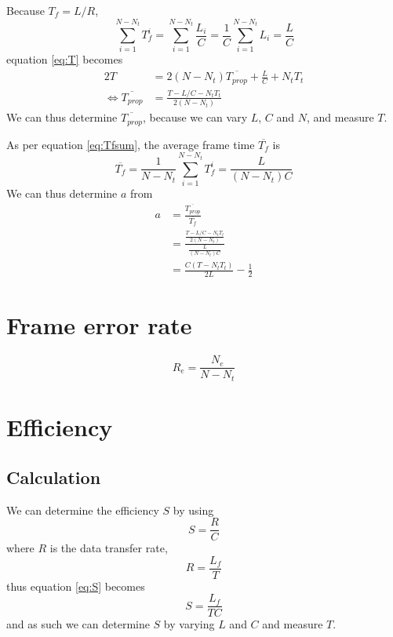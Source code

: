 \documentclass[a4paper, 11pt]{report}
\begin{document}
Because $T_f = L/R$,
\begin{equation} \label{eq:Tfsum}
	\sum_{i=1}^{N-N_t}{T_f^i} = \sum_{i=1}^{N-N_t}{\frac{L_i}{C}} = \frac{1}{C} \sum_{i=1}^{N-N_t}{L_i} = \frac{L}{C}
\end{equation}
equation \ref{eq:T} becomes
\begin{alignat}{2} \label{eq:T2}
	T & = 2 (N-N_t) \overline{T_{prop}} + \frac{L}{C} + N_t T_t \\
	\iff \overline{T_{prop}} & = \frac{T - L/C - N_t T_t}{2 (N-N_t)}
\end{alignat}
We can thus determine $\overline{T_{prop}}$, because we can vary $L$, $C$ and $N$, and measure $T$.

As per equation \ref{eq:Tfsum}, the average frame time $\overline{T_f}$ is 
\begin{equation} \label{eq:Tfmean}
	\overline{T_f} = \frac{1}{N-N_t}\sum_{i=1}^{N-N_t}{T_f^i} = \frac{L}{(N-N_t) C}
\end{equation}
We can thus determine $a$ from
\begin{equation}
\begin{alignedat}{2}
	a
	& = \frac{\overline{T_{prop}}}{\overline{T_f}} \\
	& = \frac{\frac{T - L/C - N_t T_t}{2 (N-N_t)}}{\frac{L}{(N-N_t) C}} \\
	& = \frac{C(T - N_t T_t)}{2 L} - \frac{1}{2}
\end{alignedat}
\end{equation}

\section{Frame error rate}

\begin{equation} \label{eq:Re}
	R_e = \frac{N_e}{N - N_t}
\end{equation}

\section{Efficiency}

\subsection{Calculation}

We can determine the efficiency $S$ by using 
\begin{equation} \label{eq:S}
	S = \frac{R}{C}
\end{equation}
where $R$ is the data transfer rate,
\begin{equation} \label{eq:R}
	R = \frac{L_f}{T}
\end{equation}
thus equation \ref{eq:S} becomes
\begin{equation} \label{eq:S2}
	S = \frac{L_f}{T C}
\end{equation}
and as such we can determine $S$ by varying $L$ and $C$ and measure $T$.
\end{document}
